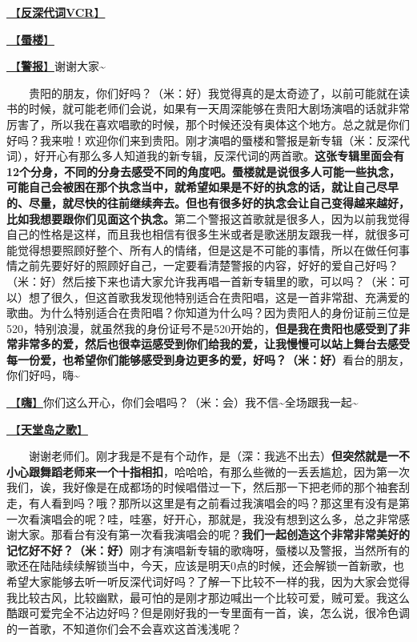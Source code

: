 \documentclass[]{ctexbook}
\begin{document}
\hyperref[senself-vcr]{🎥【\textbf{反深代词VCR}】}

\hyperref[mirage]{🎵【\textbf{蜃楼}】}

\hyperref[the-giver]{🎵【\textbf{警报}】}谢谢大家\textasciitilde{}

  贵阳的朋友，你们好吗？（米：好）我觉得真的是太奇迹了，以前可能就在读书的时候，就可能老师们会说，如果有一天周深能够在贵阳大剧场演唱的话就非常厉害了，所以我在喜欢唱歌的时候，那个时候还没有奥体这个地方。总之就是你们好吗？我来啦！欢迎你们来到贵阳。刚才演唱的蜃楼和警报是新专辑（米：反深代词），好开心有那么多人知道我的新专辑，反深代词的两首歌。\textbf{这张专辑里面会有12个分身，不同的分身去感受不同的角度吧。蜃楼就是说很多人可能一些执念，可能自己会被困在那个执念当中，就希望如果是不好的执念的话，就让自己尽早的、尽量，就尽快的往前继续奔去。但也有很多好的执念会让自己变得越来越好，比如我想要跟你们见面这个执念。}第二个警报这首歌就是很多人，因为以前我觉得自己的性格是这样，而且我也相信有很多生米或者是歌迷朋友跟我一样，就很多可能觉得想要照顾好整个、所有人的情绪，但是这是不可能的事情，所以在做任何事情之前先要好好的照顾好自己，一定要看清楚警报的内容，好好的爱自己好吗？（米：好）然后接下来也请大家允许我再唱一首新专辑里的歌，可以吗？（米：可以）想了很久，但这首歌我发现他特别适合在贵阳唱，这是一首非常甜、充满爱的歌曲。为什么特别适合在贵阳唱？你知道为什么吗？因为贵阳人的身份证前三位是520，特别浪漫，就虽然我的身份证号不是520开始的，\textbf{但是我在贵阳也感受到了非常非常多的爱，然后也很幸运感受到你们给我的爱，让我慢慢可以站上舞台去感受每一份爱，也希望你们能够感受到身边更多的爱，好吗？（米：好）}看台的朋友，你们好吗，嗨\textasciitilde{}

\hyperref[say-hi]{🎵【\textbf{嗨}】}你们这么开心，你们会唱吗？（米：会）我不信\textasciitilde 全场跟我一起\textasciitilde{}

\hyperref[haven-song]{🎵【\textbf{天堂岛之歌}】}

  谢谢老师们。刚才我是不是有个动作，是（深：我逃不出去）\textbf{但突然就是一不小心跟舞蹈老师来一个十指相扣}，哈哈哈，有那么些微的一丢丢尴尬，因为第一次我们，诶，我好像是在成都场的时候唱借过一下，然后那一下把老师的那个袖套刮走，有人看到吗？哦？那所以这里是有之前看过我演唱会的吗？那这里有没有是第一次看演唱会的呢？哇，哇塞，好开心，那就是，我没有想到这么多，总之非常感谢大家。那看台有没有第一次看我演唱会的呢？\textbf{我们一起创造这个非常非常美好的记忆好不好？（米：好）}刚才有演唱新专辑的歌嗨呀，蜃楼以及警报，当然所有的歌还在陆陆续续解锁当中，今天，应该是明天0点的时候，还会解锁一首新歌，也希望大家能够去听一听反深代词好吗？了解一下比较不一样的我，因为大家会觉得我比较古风，比较幽默，最可怕的是刚才那边喊出一个比较可爱，贼可爱。我这么酷跟可爱完全不沾边好吗？但是刚好我的一专里面有一首，诶，怎么说，很冷色调的一首歌，不知道你们会不会喜欢这首浅浅呢？
\end{document}
